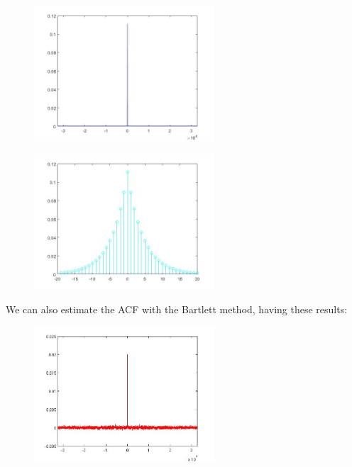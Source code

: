 \documentclass[a4paper,11pt]{article}
\begin{document}
\begin{figure}[!hp]
    \begin{center}
    \includegraphics[width=0.6\textwidth]{images/lab2_figure1.jpg}
    \end{center}
\end{figure}

\begin{figure}[!hp]
    \begin{center}
    \includegraphics[width=0.6\textwidth]{images/lab2_figure2.jpg}
    \end{center}
\end{figure}

\newpage

We can also estimate the ACF with the Bartlett method, having these results:

\begin{figure}[!hp]
    \begin{center}
    \includegraphics[width=0.6\textwidth]{images/lab2_redo_figure13.jpg}
    \end{center}
\end{figure}
\end{document}

